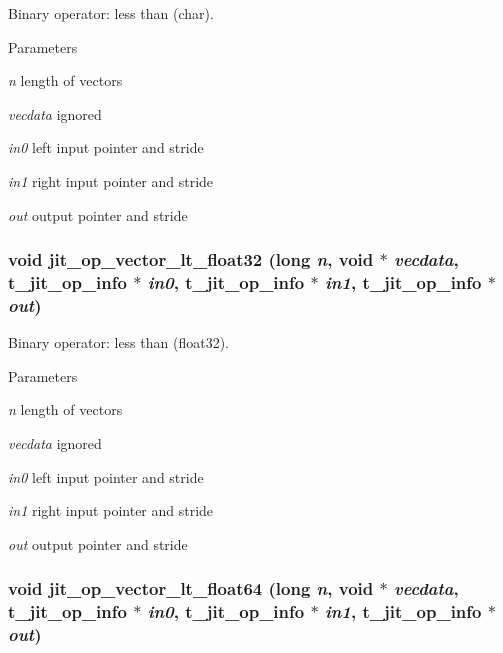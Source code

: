 Binary operator: less than (char). 
\begin{DoxyParams}{Parameters}
\item[{\em n}]length of vectors \item[{\em vecdata}]ignored \item[{\em in0}]left input pointer and stride \item[{\em in1}]right input pointer and stride \item[{\em out}]output pointer and stride \end{DoxyParams}
\hypertarget{group__opvecmod_ga230643676f4cda9a87d8a47d8a8c23a9}{
\subsubsection[{jit\_\-op\_\-vector\_\-lt\_\-float32}]{\setlength{\rightskip}{0pt plus 5cm}void jit\_\-op\_\-vector\_\-lt\_\-float32 (long {\em n}, \/  void $\ast$ {\em vecdata}, \/  {\bf t\_\-jit\_\-op\_\-info} $\ast$ {\em in0}, \/  {\bf t\_\-jit\_\-op\_\-info} $\ast$ {\em in1}, \/  {\bf t\_\-jit\_\-op\_\-info} $\ast$ {\em out})}}
\label{group__opvecmod_ga230643676f4cda9a87d8a47d8a8c23a9}


Binary operator: less than (float32). 
\begin{DoxyParams}{Parameters}
\item[{\em n}]length of vectors \item[{\em vecdata}]ignored \item[{\em in0}]left input pointer and stride \item[{\em in1}]right input pointer and stride \item[{\em out}]output pointer and stride \end{DoxyParams}
\hypertarget{group__opvecmod_gad2010efed21ed81ac35efb96a3ee65ec}{
\subsubsection[{jit\_\-op\_\-vector\_\-lt\_\-float64}]{\setlength{\rightskip}{0pt plus 5cm}void jit\_\-op\_\-vector\_\-lt\_\-float64 (long {\em n}, \/  void $\ast$ {\em vecdata}, \/  {\bf t\_\-jit\_\-op\_\-info} $\ast$ {\em in0}, \/  {\bf t\_\-jit\_\-op\_\-info} $\ast$ {\em in1}, \/  {\bf t\_\-jit\_\-op\_\-info} $\ast$ {\em out})}}
\label{group__opvecmod_gad2010efed21ed81ac35efb96a3ee65ec}


